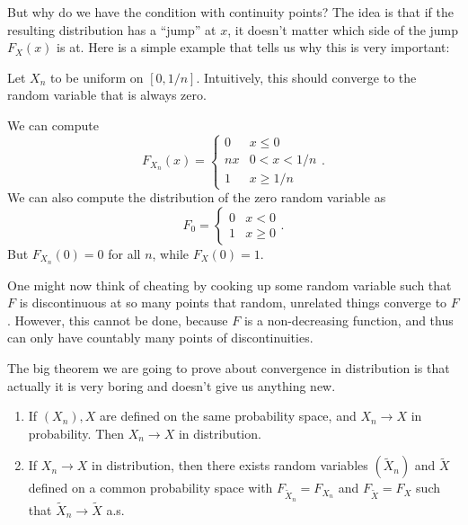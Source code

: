 \documentclass[a4paper]{article}
\begin{document}
But why do we have the condition with continuity points? The idea is that if the resulting distribution has a ``jump'' at $x$, it doesn't matter which side of the jump $F_X(x)$ is at. Here is a simple example that tells us why this is very important:

\begin{eg}
  Let $X_n$ to be uniform on $[0, 1/n]$. Intuitively, this should converge to the random variable that is always zero.

  We can compute
  \[
    F_{X_n} (x) =
    \begin{cases}
      0 & x \leq 0\\
      nx & 0 < x< 1/n\\
      1 & x \geq 1/n
    \end{cases}.
  \]
  We can also compute the distribution of the zero random variable as
  \[
    F_0 =
    \begin{cases}
      0 & x < 0\\
      1 & x \geq 0
    \end{cases}.
  \]
  But $F_{X_n}(0) = 0 $ for all $n$, while $F_X(0) = 1$.
\end{eg}
One might now think of cheating by cooking up some random variable such that $F$ is discontinuous at so many points that random, unrelated things converge to $F$. However, this cannot be done, because $F$ is a non-decreasing function, and thus can only have countably many points of discontinuities.

The big theorem we are going to prove about convergence in distribution is that actually it is very boring and doesn't give us anything new.

\begin{thm}\leavevmode
  \begin{enumerate}
    \item If $(X_n), X$ are defined on the same probability space, and $X_n \to X$ in probability. Then $X_n \to X$ in distribution.
    \item If $X_n \to X$ in distribution, then there exists random variables $(\tilde{X}_n)$ and $\tilde{X}$ defined on a common probability space with $F_{\tilde{X}_n} = F_{X_n}$ and $F_{\tilde{X}} = F_X$ such that $\tilde{X}_n \to \tilde{X}$ a.s.
  \end{enumerate}
\end{thm}
\end{document}
